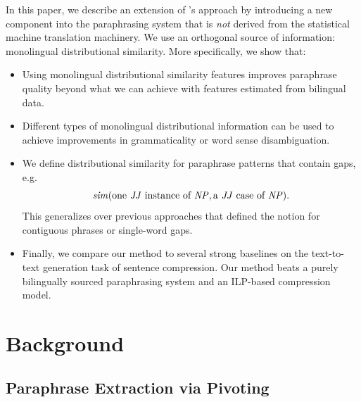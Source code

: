 \documentclass[11pt]{article}
\begin{document}
In this paper, we describe an extension of
's approach by introducing a new component
into the paraphrasing system that is \emph{not} derived from the
statistical machine translation machinery. We use an orthogonal source
of information: monolingual distributional similarity. More
specifically, we show that:
\begin{itemize}
\item Using monolingual distributional similarity features improves
  paraphrase quality beyond what we can achieve with features estimated
  from bilingual data. 

\item Different types of monolingual distributional information can be
  used to achieve improvements in grammaticality or word sense
  disambiguation.

\item We define distributional similarity for paraphrase patterns that
  contain gaps, e.g.  \vspace{-6pt}
  \begin{equation*}\mathit{sim}(\text{one }\mathit{JJ}\text{ instance of }\mathit{NP}, \text{a }\mathit{JJ}\text{ case of }\mathit{NP} ).  \vspace{-2pt}
  \end{equation*} 
  This generalizes over previous approaches that defined the notion
  for contiguous phrases or single-word gaps.

\item Finally, we compare our method to several strong baselines on
  the text-to-text generation task of sentence compression. Our method
  beats a purely bilingually sourced paraphrasing system and an
  ILP-based compression model.
\end{itemize}

\section{Background}

\subsection{Paraphrase Extraction via Pivoting}
\label{sec-scfgs}
\end{document}
